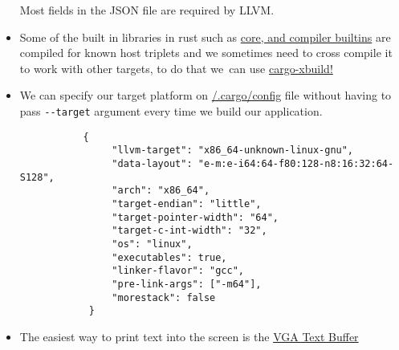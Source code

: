 \documentclass{article}
\begin{document}
\begin{itemize}
    Most fields in the JSON file are required by LLVM.
    \item Some of the built in libraries in rust such as \hyperlink{ref:core-builtins}{core, and compiler builtins} are compiled for known host triplets and we sometimes need to cross compile it to work with other targets, to do that we\
    can use \hyperlink{ref:cargo-xbuild}{cargo-xbuild!}
    \item We can specify our target platform on \hyperlink{ref:cargo-config}{/.cargo/config} file without having to pass \verb|--target| argument every time we build our application.
    \begin{listing}[h]
        \begin{verbatim}
           {
                "llvm-target": "x86_64-unknown-linux-gnu",
                "data-layout": "e-m:e-i64:64-f80:128-n8:16:32:64-S128",
                "arch": "x86_64",
                "target-endian": "little",
                "target-pointer-width": "64",
                "target-c-int-width": "32",
                "os": "linux",
                "executables": true,
                "linker-flavor": "gcc",
                "pre-link-args": ["-m64"],
                "morestack": false
            } 
        \end{verbatim}
    \end{listing} 
    \item The easiest way to print text into the screen is the \hyperlink{ref:vga}{VGA Text Buffer}
 \end{itemize}
\end{document}
